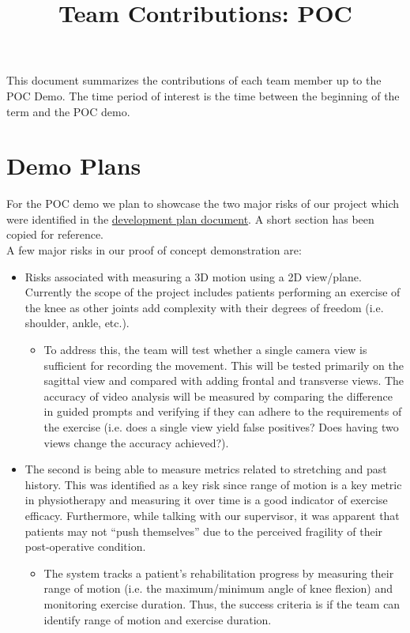 \documentclass{article}
\title{Team Contributions: POC\\\progname}
\author{\authname}
\date{}
\begin{document}
\maketitle

\noindent This document summarizes the contributions of each team member up to the POC Demo. The time period of interest is the time between the beginning of the term
and the POC demo.

\section{Demo Plans}

For the POC demo we plan to showcase the two major risks of our project which were identified in the \href{https://github.com/M9Huynh/technically-functional/blob/main/docs/DevelopmentPlan/DevelopmentPlan.pdf}{development plan document}. A short section has been copied for reference. \\

\noindent A few major risks in our proof of concept demonstration are:
\begin{itemize}
  \item Risks associated with measuring a 3D motion using a 2D view/plane. Currently the scope of the project includes patients performing an exercise of the knee as other joints add complexity with their degrees of freedom (i.e. shoulder, ankle, etc.).
  \begin{itemize}
    \item To address this, the team will test whether a  single camera view is sufficient for recording the movement. This will be tested primarily on the sagittal view and compared with adding frontal and transverse views. The accuracy of video analysis will be measured by comparing the difference in guided prompts and verifying if they can adhere to the requirements of the exercise (i.e. does a single view yield false positives? Does having two views change the accuracy achieved?).
  \end{itemize}  
  \item The second is being able to measure metrics related to stretching and past history. This was identified as a key risk since range of motion is a key metric in physiotherapy and measuring it over time is a good indicator of exercise efficacy. Furthermore, while talking with our supervisor, it was apparent that patients may not “push themselves” due to the perceived fragility of their post-operative condition.
  \begin{itemize}
    \item The system tracks a patient's rehabilitation progress by measuring their range of motion (i.e. the maximum/minimum angle of knee flexion) and monitoring exercise duration. Thus, the success criteria is if the team can identify range of motion and exercise duration.
  \end{itemize}
\end{itemize}
\end{document}
